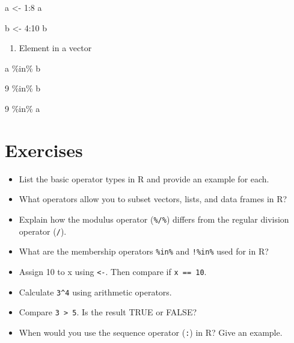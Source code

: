 \documentclass[
  letterpaper,
  DIV=11,
  numbers=noendperiod]{scrreprt}
\newenvironment{Shaded}{}{}
\newcommand{\DecValTok}[1]{\textcolor[rgb]{0.00,0.36,0.77}{#1}}
\newcommand{\NormalTok}[1]{\textcolor[rgb]{0.14,0.16,0.18}{#1}}
\newcommand{\OtherTok}[1]{\textcolor[rgb]{0.44,0.26,0.76}{#1}}
\newcommand{\SpecialCharTok}[1]{\textcolor[rgb]{0.00,0.36,0.77}{#1}}
\providecommand{\tightlist}{%
  \setlength{\itemsep}{0pt}\setlength{\parskip}{0pt}}\usepackage{longtable,booktabs,array}
\begin{document}
\begin{Shaded}
\begin{Highlighting}[]
\NormalTok{a }\OtherTok{\textless{}{-}} \DecValTok{1}\SpecialCharTok{:}\DecValTok{8}
\NormalTok{a}
\end{Highlighting}
\end{Shaded}

\begin{Shaded}
\begin{Highlighting}[]
\NormalTok{b }\OtherTok{\textless{}{-}} \DecValTok{4}\SpecialCharTok{:}\DecValTok{10}
\NormalTok{b}
\end{Highlighting}
\end{Shaded}

\begin{enumerate}
\def\labelenumi{\alph{enumi}.}
\setcounter{enumi}{1}
\tightlist
\item
  Element in a vector
\end{enumerate}

\begin{Shaded}
\begin{Highlighting}[]
\NormalTok{a }\SpecialCharTok{\%in\%}\NormalTok{ b}
\end{Highlighting}
\end{Shaded}

\begin{Shaded}
\begin{Highlighting}[]
\DecValTok{9} \SpecialCharTok{\%in\%}\NormalTok{ b}
\end{Highlighting}
\end{Shaded}

\begin{Shaded}
\begin{Highlighting}[]
\DecValTok{9} \SpecialCharTok{\%in\%}\NormalTok{ a}
\end{Highlighting}
\end{Shaded}

\section{Exercises}\label{exercises-6}

\begin{itemize}
\item
  List the basic operator types in R and provide an example for each.
\item
  What operators allow you to subset vectors, lists, and data frames in
  R?
\item
  Explain how the modulus operator (\texttt{\%/\%}) differs from the
  regular division operator (\texttt{/}).
\item
  What are the membership operators \texttt{\%in\%} and \texttt{!\%in\%}
  used for in R?
\item
  Assign 10 to x using \texttt{\textless{}-}. Then compare if
  \texttt{x\ ==\ 10}.
\item
  Calculate \texttt{3\^{}4} using arithmetic operators.
\item
  Compare \texttt{3\ \textgreater{}\ 5}. Is the result TRUE or FALSE?
\item
  When would you use the sequence operator (\texttt{:}) in R? Give an
  example.
\end{itemize}
\end{document}
